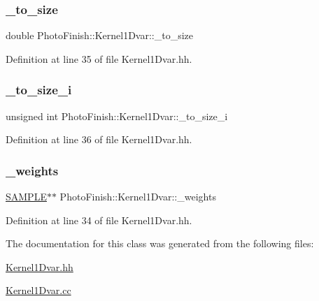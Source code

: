 \subsubsection{\texorpdfstring{\+\_\+to\+\_\+size}{\_to\_size}}
{\footnotesize\ttfamily double Photo\+Finish\+::\+Kernel1\+Dvar\+::\+\_\+to\+\_\+size\hspace{0.3cm}{\ttfamily [protected]}}



Definition at line 35 of file Kernel1\+Dvar.\+hh.

\mbox{\label{class_photo_finish_1_1_kernel1_dvar_a0d5bc69e7ee21e60620a348092b3c5f2}} 
\subsubsection{\texorpdfstring{\+\_\+to\+\_\+size\+\_\+i}{\_to\_size\_i}}
{\footnotesize\ttfamily unsigned int Photo\+Finish\+::\+Kernel1\+Dvar\+::\+\_\+to\+\_\+size\+\_\+i\hspace{0.3cm}{\ttfamily [protected]}}



Definition at line 36 of file Kernel1\+Dvar.\+hh.

\mbox{\label{class_photo_finish_1_1_kernel1_dvar_ac75e5c7bd6fdbf5c645c6504b938ed97}} 
\subsubsection{\texorpdfstring{\+\_\+weights}{\_weights}}
{\footnotesize\ttfamily \hyperlink{sample_8h_afc597c76b4f04a2da506a240d51d89a0}{S\+A\+M\+P\+LE}$\ast$$\ast$ Photo\+Finish\+::\+Kernel1\+Dvar\+::\+\_\+weights\hspace{0.3cm}{\ttfamily [protected]}}



Definition at line 34 of file Kernel1\+Dvar.\+hh.



The documentation for this class was generated from the following files\+:\begin{DoxyCompactItemize}
\item 
\hyperlink{_kernel1_dvar_8hh}{Kernel1\+Dvar.\+hh}\item 
\hyperlink{_kernel1_dvar_8cc}{Kernel1\+Dvar.\+cc}\end{DoxyCompactItemize}
